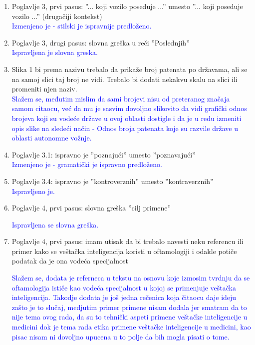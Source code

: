 \documentclass[a4paper]{report}
\newcommand{\odgovor}[1]{\textcolor{blue}{#1}}
\begin{document}
\begin{enumerate}
\item Poglavlje 3, prvi pasus: ''... koji vozilo poseduje ...'' umesto ''... koji poseduje vozilo ...'' (drugačiji kontekst) \\
\odgovor{Izmenjeno je - stilski je ispravnije predloženo.}

\item Poglavlje 3, drugi pasus: slovna greška u reči ''Poslednjih'' \\
\odgovor{Ispravljena je slovna greska.}

\item Slika 1 bi prema nazivu trebalo da prikaže broj patenata po državama, ali se na samoj slici taj broj ne vidi. Trebalo bi dodati nekakvu skalu na slici ili promeniti njen naziv. \\
\odgovor{Slažem se, međutim mislim da sami brojevi nisu od preteranog značaja samom citaocu, već da mu je sasvim dovoljno slikovito da vidi grafički odnos brojeva koji su vodeće države u ovoj oblasti dostigle i da je u redu izmeniti opis slike na sledeći način -  Odnos broja patenata koje su razvile države u oblasti autonomne vožnje.}

\item Poglavlje 3.1: ispravno je ''poznajući'' umesto ''poznavajući'' \\
\odgovor{Izmenjeno je - gramatički je ispravno predloženo.} 

\item Poglavlje 3.4: ispravno je ''kontroverznih'' umesto ''kontraverznih'' \\
\odgovor{Ispravljeno je.}

\item Poglavlje 4, prvi pasus: slovna greška ''cilj primene''

\odgovor{Ispravljena se slovna greška.} 

\item Poglavlje 4, prvi pasus: imam utisak da bi trebalo navesti neku referencu ili primer kako se veštačka inteligencija koristi u oftamologiji i odakle potiče podatak da je ona vodeća specijalnost 

\odgovor{Slažem se, dodata je referneca u tekstu na osnovu koje izmosim tvrdnju da se oftamologija ističe kao vodeća specijalnost u kojoj se primenjuje veštačka inteligencija. Takodje dodata je još jedna rečenica koja čitaocu daje ideju zašto je to slučaj, medjutim primer primene nisam dodala jer smatram da to nije tema ovog rada, da su to tehnički aspeti primene veštačke inteligencije u medicini dok je tema rada etika primene veštačke inteligencije u medicini, kao pisac nisam ni dovoljno upucena u to polje da bih mogla pisati o tome.} 


\end{enumerate}
\end{document}

